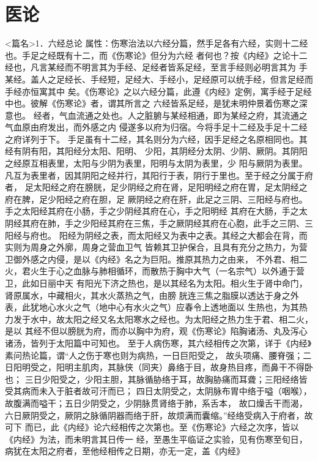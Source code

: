 \documentclass[a4paper,12pt,UTF8,twoside]{ctexbook}
\begin{document}
\part{医论}
<篇名>1．六经总论
属性：伤寒治法以六经分篇，然手足各有六经，实则十二经也。手足之经既有十二，而《伤寒论》但分为六经 
者何也？按《内经》之论十二经也，凡言某经而不明言其为手经、足经者皆系足经，至言手经则必明言其为 
手某经。盖人之足经长、手经短，足经大、手经小，足经原可以统手经，但言足经而手经亦恒寓其中 
矣。《伤寒论》之以六经分篇，此遵《内经》定例，寓手经于足经中也。彼解《伤寒论》者，谓其所言之 
六经皆系足经，是犹未明仲景着伤寒之深意也。 
经者，气血流通之处也。人之脏腑与某经相通，即为某经之府，其流通之气血原由府发出，而外感之内 
侵遂多以府为归宿。今将手足十二经及手足十二经之府详列于下。 
手足虽有十二经，其名则分为六经，因手足经之名原相同也。其经有阴有阳，其阳经分太阳、阳明、 
少阳，其阴经分太阴、少阴、厥阴。其阴阳之经原互相表里，太阳与少阴为表里，阳明与太阴为表里，少 
阳与厥阴为表里。凡互为表里者，因其阴阳之经并行，其阳行于表，阴行于里也。至于经之分属于府者， 
足太阳经之府在膀胱，足少阴经之府在肾，足阳明经之府在胃，足太阴经之府在脾，足少阳经之府在胆，足 
厥阴经之府在肝，此足之三阴、三阳经与府也。 
手之太阳经其府在小肠，手之少阴经其府在心，手之阳明经 
其府在大肠，手之太阴经其府在肺，手之少阳经其府在三焦，手之厥阴经其府在心胞，此手之三阴、三阳经与府也。 
阳经为阴经之表，而太阳经又为表中之表。其经之大都会在背，而实则为周身之外廓，周身之营血卫气 
皆赖其卫护保合，且具有充分之热力，为营卫御外感之内侵，是以《内经》名之为巨阳。推原其热力之由来， 
不外君、相二火，君火生于心之血脉与肺相循环，而散热于胸中大气（一名宗气）以外通于营卫，此如日丽中天 
有阳光下济之热也，是以其经名为太阳。相火生于肾中命门，肾原属水，中藏相火，其水火蒸热之气，由膀 
胱连三焦之脂膜以透达于身之外表，此犹地心水火之气（地中心有水火之气）应春令上透地面以 
生热也，为其热力发于水中，故太阳之经又名太阳寒水之经也。为太阳经之热力生于君、相二火，是以 
其经不但以膀胱为府，而亦以胸中为府，观《伤寒论》陷胸诸汤、丸及泻心诸汤，皆列于太阳篇中可知也。 
至于人病伤寒，其六经相传之次第，详于《内经》素问热论篇，谓“人之伤于寒也则为病热，一日巨阳受之， 
故头项痛、腰脊强；二日阳明受之，阳明主肌肉，其脉侠（同夹）鼻络于目，故身热目疼，而鼻干不得卧也； 
三日少阳受之，少阳主胆，其脉循胁络于耳，故胸胁痛而耳聋；三阳经络皆受其病而未入于脏者故可汗而已； 
四日太阴受之，太阴脉布胃中络于嗌（咽喉），故腹满而嗌干；五日少阴受之，少阴脉贯肾络于肺，系舌本， 
故口燥舌干而渴，六日厥阴受之，厥阴之脉循阴器而络于肝，故烦满而囊缩。”经络受病入于府者，故可下 
而已，此《内经》论六经相传之次第也。至《伤寒论》六经之次序，皆以《内经》为法，而未明言其日传一 
经，至愚生平临证之实验，见有伤寒至旬日，病犹在太阳之府者，至他经相传之日期，亦无一定，盖《内经》 
\end{document}
